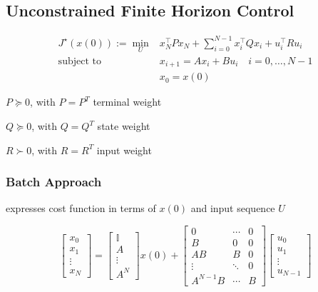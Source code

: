 




\subsection{Unconstrained Finite Horizon Control}


$$\begin{aligned}
		J^\star(x(0)) :=
		\min_U & x_N^\top P x_N +
		\textstyle\sum_{i=0}^{N-1}
		x_i^\top Q x_i + u_i^\top R u_i
		\\
		\text{subject to  }
		       & x_{i+1}                = Ax_i+Bu_i
		\quad i  = 0,\dots,N-1                      \\
		       & x_0                    = x(0)
	\end{aligned}$$

$P\succeq0$, with $P=P^T$
terminal weight

$Q\succeq0$, with $Q = Q^T$
state weight

$R\succ0$, with $R = R^T$
input weight


\subsubsection{Batch Approach}

expresses cost function in terms of $x(0)$ and input sequence $U$

\[ \begin{bmatrix}
		x_0    \\
		x_1    \\
		\vdots \\
		x_N
	\end{bmatrix}
	=
	\begin{bmatrix}
		\mathbb{I} \\
		A          \\
		\vdots     \\
		A^N
	\end{bmatrix}
	x(0) +
	\begin{bmatrix}
		0        & \cdots & 0 \\
		B        & 0      & 0 \\
		AB       & B      & 0 \\
		\vdots   & \ddots & 0 \\
		A^{N-1}B & \cdots & B
	\end{bmatrix}
	\begin{bmatrix}
		u_0    \\
		u_1    \\
		\vdots \\
		u_{N-1}
	\end{bmatrix} \]


